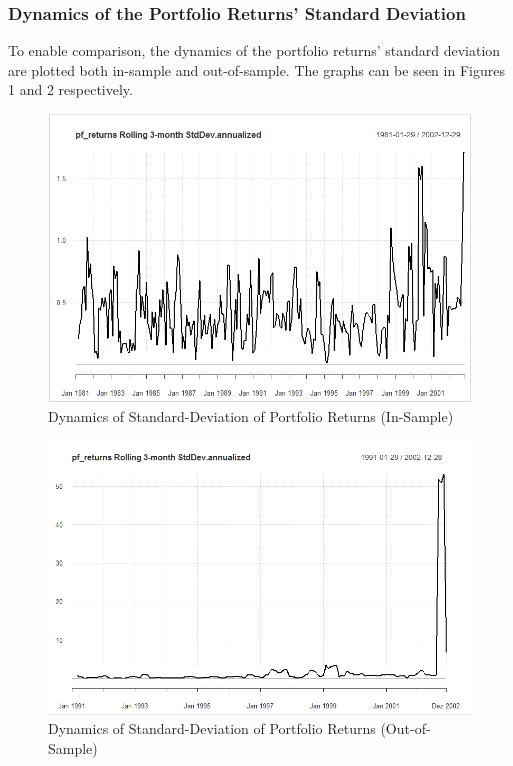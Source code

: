 \documentclass{article}
\begin{document}
\subsubsection{Dynamics of the Portfolio Returns' Standard Deviation}
To enable comparison, the dynamics of the portfolio returns' standard deviation are plotted both in-sample and out-of-sample. The graphs can be seen in Figures 1 and 2 respectively. 
\begin {figure}[htb]
    \begin{center}
    \includegraphics[scale=0.4]{sd_dynamics_pf_returns_3months_in_sample.PNG}
    \caption{Dynamics of Standard-Deviation of Portfolio Returns (In-Sample)}
    \end{center}
\end{figure}
\begin {figure}[H]
    \begin{center}
    \includegraphics[scale=0.4]{sd_dynamics_pf_returns_3months_out_of_sample.PNG}
    \caption{Dynamics of Standard-Deviation of Portfolio Returns (Out-of-Sample)}
    \end{center}
\end{figure}
\end{document}
